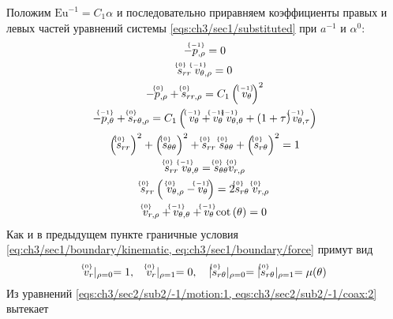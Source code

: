 Положим $\text{Eu}^{-1} = C_1 \alpha$ и последовательно приравняем коэффициенты правых и левых частей уравнений системы \cref{eqs:ch3/sec1/substituted} при $a^{-1}$ и $\alpha^0$:
\begin{subequations}
  \label{eqs:ch3/sec2/sub2/main}
  \begin{gather}
    \label{eqs:ch3/sec2/sub2/-1/motion:1}
    -\uindex{p}{-1}_{,\rho} = 0
    \\
    \label{eqs:ch3/sec2/sub2/-1/coax:2}
    \uindex{s}{0}_{rr} \; \uindex{v}{-1}_{\theta,\rho} = 0
    \\
    \label{eqs:ch3/sec2/sub2/0/motion:1}
    -\uindex{p}{0}_{,\rho} + \uindex{s}{0}_{rr,\rho} = C_1 \left(\ \uindex{v}{-1}_{\theta}\right)^2
    \\
    \label{eqs:ch3/sec2/sub2/0/motion:2}
    -\uindex{p}{-1}_{,\theta} + \uindex{s}{0}_{r\theta,\rho} = C_1 \left(\ \uindex{v}{-1}_{\theta} + \uindex{v}{-1}_{\theta} \; \uindex{v}{-1}_{\theta,\theta} +
    \left(1+\tau\right) \uindex{v}{-1}_{\theta,\tau}\right)
    \\
    \label{eqs:ch3/sec2/sub2/0/plasticity}
    \left(\uindex{s}{0}_{rr}\right)^2 + \left(\uindex{s}{0}_{\theta\theta}\right)^2 + \uindex{s}{0}_{rr}\; \uindex{s}{0}_{\theta\theta} + \left(\uindex{s}{0}_{r\theta}\right)^2 = 1
    \\
    \label{eqs:ch3/sec2/sub2/0/coax:1}
    \uindex{s}{0}_{rr} \; \uindex{v}{-1}_{\theta,\theta} = \uindex{s}{0}_{\theta\theta} \uindex{v}{0}_{r,\rho}
    \\
    \label{eqs:ch3/sec2/sub2/0/coax:2}
    \uindex{s}{0}_{rr} \left(\ \uindex{v}{0}_{\theta,\rho} - \uindex{v}{-1}_{\theta}\right) = 2 \uindex{s}{0}_{r\theta} \; \uindex{v}{0}_{r,\rho}
    \\
    \label{eqs:ch3/sec2/sub2/0/uncompress}
    \uindex{v}{0}_{r,\rho} + \uindex{v}{-1}_{\theta,\theta} + \uindex{v}{-1}_{\theta} \cot{\left(\theta\right)} = 0
  \end{gather}
\end{subequations}
Как и в предыдущем пункте граничные условия \cref{eq:ch3/sec1/boundary/kinematic, eq:ch3/sec1/boundary/force} примут вид
\begin{equation}
  \label{eq:ch3/sec2/sub2/boundary/0}
  \uindex{v}{0}_{r}\lvert_{\rho=0} = 1, \quad \uindex{v}{0}_{r}\lvert_{\rho=1} = 0, \quad \lvert \uindex{s}{0}_{r\theta}\lvert_{\rho=0} = \lvert \uindex{s}{0}_{r\theta}\lvert_{\rho=1} = \mu(\theta)
\end{equation}
Из уравнений \cref{eqs:ch3/sec2/sub2/-1/motion:1, eqs:ch3/sec2/sub2/-1/coax:2} вытекает
